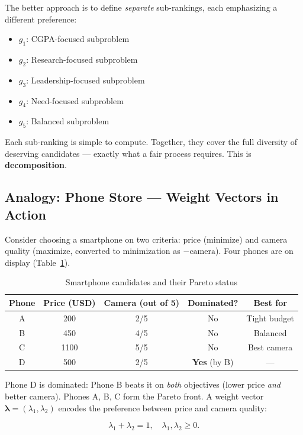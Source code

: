 \documentclass[12pt,a4paper]{article}
\begin{document}
The better approach is to define \emph{separate} sub-rankings, each emphasizing a different preference:
\begin{itemize}[leftmargin=1.5cm]
    \item $g_1$: CGPA-focused subproblem
    \item $g_2$: Research-focused subproblem
    \item $g_3$: Leadership-focused subproblem
    \item $g_4$: Need-focused subproblem
    \item $g_5$: Balanced subproblem
\end{itemize}

Each sub-ranking is simple to compute. Together, they cover the full diversity of deserving candidates --- exactly what a fair process requires. This is \textbf{decomposition}.

\subsection{Analogy: Phone Store — Weight Vectors in Action}

Consider choosing a smartphone on two criteria: price (minimize) and camera quality (maximize, converted to minimization as $-\text{camera}$). Four phones are on display (Table~\ref{tab:phones}).

\begin{table}[H]
\centering
\caption{Smartphone candidates and their Pareto status}
\label{tab:phones}
\renewcommand{\arraystretch}{1.3}
\begin{tabular}{ccccc}
\toprule
\textbf{Phone} & \textbf{Price (USD)} & \textbf{Camera (out of 5)} & \textbf{Dominated?} & \textbf{Best for} \\
\midrule
A & 200  & 2/5 & No  & Tight budget \\
B & 450  & 4/5 & No  & Balanced     \\
C & 1100 & 5/5 & No  & Best camera  \\
D & 500  & 2/5 & \textbf{Yes} (by B) & --- \\
\bottomrule
\end{tabular}
\end{table}

Phone D is dominated: Phone B beats it on \emph{both} objectives (lower price \emph{and} better camera). Phones A, B, C form the Pareto front. A weight vector $\boldsymbol{\lambda} = (\lambda_1, \lambda_2)$ encodes the preference between price and camera quality:

\begin{equation}
    \lambda_1 + \lambda_2 = 1, \quad \lambda_1, \lambda_2 \geq 0.
\end{equation}
\end{document}
